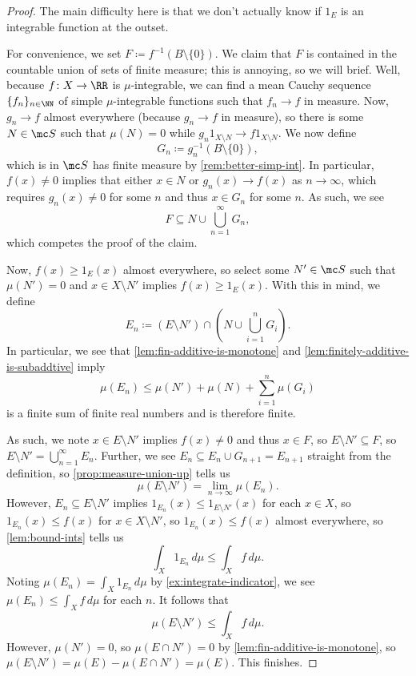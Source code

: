 \documentclass[../notes.tex]{subfiles}
\begin{document}
\begin{proof}
	The main difficulty here is that we don't actually know if $1_E$ is an integrable function at the outset.
	
	For convenience, we set $F\coloneqq f^{-1}(B\setminus\{0\})$. We claim that $F$ is contained in the countable union of sets of finite measure; this is annoying, so we will brief. Well, because $f\colon X\to\RR$ is $\mu$-integrable, we can find a mean Cauchy sequence $\{f_n\}_{n\in\NN}$ of simple $\mu$-integrable functions such that $f_n\to f$ in measure. Now, $g_n\to f$ almost everywhere (because $g_n\to f$ in measure), so there is some $N\in\mc S$ such that $\mu(N)=0$ while $g_n1_{X\setminus N}\to f1_{X\setminus N}$. We now define
	\[G_n\coloneqq g_n^{-1}(B\setminus\{0\}),\]
	which is in $\mc S$ has finite measure by \autoref{rem:better-simp-int}. In particular, $f(x)\ne0$ implies that either $x\in N$ or $g_n(x)\to f(x)$ as $n\to\infty$, which requires $g_n(x)\ne0$ for some $n$ and thus $x\in G_n$ for some $n$. As such, we see
	\[F\subseteq N\cup\bigcup_{n=1}^\infty G_n,\]
	which competes the proof of the claim.

	Now, $f(x)\ge1_E(x)$ almost everywhere, so select some $N'\in\mc S$ such that $\mu(N')=0$ and $x\in X\setminus N'$ implies $f(x)\ge1_E(x)$. With this in mind, we define
	\[E_n\coloneqq (E\setminus N')\cap\left(N\cup\bigcup_{i=1}^n G_i\right).\]
	In particular, we see that \autoref{lem:fin-additive-is-monotone} and \autoref{lem:finitely-additive-is-subaddtive} imply
	\[\mu(E_n)\le\mu(N')+\mu(N)+\sum_{i=1}^n\mu(G_i)\]
	is a finite sum of finite real numbers and is therefore finite.

	As such, we note $x\in E\setminus N'$ implies $f(x)\ne0$ and thus $x\in F$, so $E\setminus N'\subseteq F$, so $E\setminus N'=\bigcup_{n=1}^\infty E_n$. Further, we see $E_n\subseteq E_n\cup G_{n+1}=E_{n+1}$ straight from the definition, so \autoref{prop:measure-union-up} tells us
	\[\mu(E\setminus N')=\lim_{n\to\infty}\mu(E_n).\]
	However, $E_n\subseteq E\setminus N'$ implies $1_{E_n}(x)\le1_{E\setminus N'}(x)$ for each $x\in X$, so $1_{E_n}(x)\le f(x)$ for $x\in X\setminus N'$, so $1_{E_n}(x)\le f(x)$ almost everywhere, so \autoref{lem:bound-ints} tells us
	\[\int_X1_{E_n}\,d\mu\le\int_Xf\,d\mu.\]
	Noting $\mu(E_n)=\int_X1_{E_n}\,d\mu$ by \autoref{ex:integrate-indicator}, we see $\mu(E_n)\le\int_Xf\,d\mu$ for each $n$. It follows that
	\[\mu(E\setminus N')\le\int_Xf\,d\mu.\]
	However, $\mu(N')=0$, so $\mu(E\cap N')=0$ by \autoref{lem:fin-additive-is-monotone}, so $\mu(E\setminus N')=\mu(E)-\mu(E\cap N')=\mu(E)$. This finishes.
\end{proof}
\end{document}
